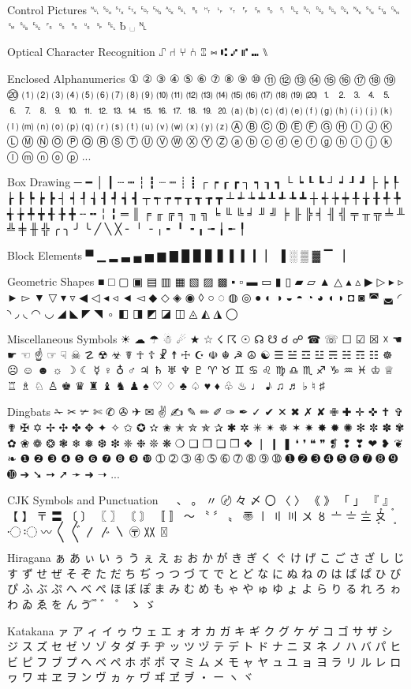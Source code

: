 \documentclass[12pt,twoside]{memoir}
\begin{document}
Control Pictures
␀ ␁ ␂ ␃ ␄ ␅ ␆ ␇ ␈ ␉ ␊ ␋ ␌ ␍ ␎ ␏ ␐ ␑ ␒ ␓ ␔ ␕ ␖ ␗ ␘ ␙ ␚ ␛ ␜ ␝ ␞ ␟ ␠ ␡ ␢ ␣ ␤

Optical Character Recognition
⑀ ⑁ ⑂ ⑃ ⑄ ⑅ ⑆ ⑇ ⑈ ⑉ ⑊

Enclosed Alphanumerics
① ② ③ ④ ⑤ ⑥ ⑦ ⑧ ⑨ ⑩ ⑪ ⑫ ⑬ ⑭ ⑮ ⑯ ⑰ ⑱ ⑲ ⑳ ⑴ ⑵ ⑶ ⑷ ⑸ ⑹ ⑺ ⑻ ⑼ ⑽ ⑾ ⑿ ⒀ ⒁ ⒂ ⒃ ⒄ ⒅ ⒆ ⒇ ⒈ ⒉ ⒊ ⒋ ⒌ ⒍ ⒎ ⒏ ⒐ ⒑ ⒒ ⒓ ⒔ ⒕ ⒖ ⒗ ⒘ ⒙ ⒚ ⒛ ⒜ ⒝ ⒞ ⒟ ⒠ ⒡ ⒢ ⒣ ⒤ ⒥ ⒦ ⒧ ⒨ ⒩ ⒪ ⒫ ⒬ ⒭ ⒮ ⒯ ⒰ ⒱ ⒲ ⒳ ⒴ ⒵ Ⓐ Ⓑ Ⓒ Ⓓ Ⓔ Ⓕ Ⓖ Ⓗ Ⓘ Ⓙ Ⓚ Ⓛ Ⓜ Ⓝ Ⓞ Ⓟ Ⓠ Ⓡ Ⓢ Ⓣ Ⓤ Ⓥ Ⓦ Ⓧ Ⓨ Ⓩ ⓐ ⓑ ⓒ ⓓ ⓔ ⓕ ⓖ ⓗ ⓘ ⓙ ⓚ ⓛ ⓜ ⓝ ⓞ ⓟ ...

Box Drawing
─ ━ │ ┃ ┄ ┅ ┆ ┇ ┈ ┉ ┊ ┋ ┌ ┍ ┎ ┏ ┐ ┑ ┒ ┓ └ ┕ ┖ ┗ ┘ ┙ ┚ ┛ ├ ┝ ┞ ┟ ┠ ┡ ┢ ┣ ┤ ┥ ┦ ┧ ┨ ┩ ┪ ┫ ┬ ┭ ┮ ┯ ┰ ┱ ┲ ┳ ┴ ┵ ┶ ┷ ┸ ┹ ┺ ┻ ┼ ┽ ┾ ┿ ╀ ╁ ╂ ╃ ╄ ╅ ╆ ╇ ╈ ╉ ╊ ╋ ╌ ╍ ╎ ╏ ═ ║ ╒ ╓ ╔ ╕ ╖ ╗ ╘ ╙ ╚ ╛ ╜ ╝ ╞ ╟ ╠ ╡ ╢ ╣ ╤ ╥ ╦ ╧ ╨ ╩ ╪ ╫ ╬ ╭ ╮ ╯ ╰ ╱ ╲ ╳ ╴ ╵ ╶ ╷ ╸ ╹ ╺ ╻ ╼ ╽ ╾ ╿

Block Elements
▀ ▁ ▂ ▃ ▄ ▅ ▆ ▇ █ ▉ ▊ ▋ ▌ ▍ ▎ ▏ ▐ ░ ▒ ▓ ▔ ▕

Geometric Shapes
■ □ ▢ ▣ ▤ ▥ ▦ ▧ ▨ ▩ ▪ ▫ ▬ ▭ ▮ ▯ ▰ ▱ ▲ △ ▴ ▵ ▶ ▷ ▸ ▹ ► ▻ ▼ ▽ ▾ ▿ ◀ ◁ ◂ ◃ ◄ ◅ ◆ ◇ ◈ ◉ ◊ ○ ◌ ◍ ◎ ● ◐ ◑ ◒ ◓ ◔ ◕ ◖ ◗ ◘ ◙ ◚ ◛ ◜ ◝ ◞ ◟ ◠ ◡ ◢ ◣ ◤ ◥ ◦ ◧ ◨ ◩ ◪ ◫ ◬ ◭ ◮ ◯

Miscellaneous Symbols
☀ ☁ ☂ ☃ ☄ ★ ☆ ☇ ☈ ☉ ☊ ☋ ☌ ☍ ☎ ☏ ☐ ☑ ☒ ☓ ☚ ☛ ☜ ☝ ☞ ☟ ☠ ☡ ☢ ☣ ☤ ☥ ☦ ☧ ☨ ☩ ☪ ☫ ☬ ☭ ☮ ☯ ☰ ☱ ☲ ☳ ☴ ☵ ☶ ☷ ☸ ☹ ☺ ☻ ☼ ☽ ☾ ☿ ♀ ♁ ♂ ♃ ♄ ♅ ♆ ♇ ♈ ♉ ♊ ♋ ♌ ♍ ♎ ♏ ♐ ♑ ♒ ♓ ♔ ♕ ♖ ♗ ♘ ♙ ♚ ♛ ♜ ♝ ♞ ♟ ♠ ♡ ♢ ♣ ♤ ♥ ♦ ♧ ♨ ♩ ♪ ♫ ♬ ♭ ♮ ♯

Dingbats
✁ ✂ ✃ ✄ ✆ ✇ ✈ ✉ ✌ ✍ ✎ ✏ ✐ ✑ ✒ ✓ ✔ ✕ ✖ ✗ ✘ ✙ ✚ ✛ ✜ ✝ ✞ ✟ ✠ ✡ ✢ ✣ ✤ ✥ ✦ ✧ ✩ ✪ ✫ ✬ ✭ ✮ ✯ ✰ ✱ ✲ ✳ ✴ ✵ ✶ ✷ ✸ ✹ ✺ ✻ ✼ ✽ ✾ ✿ ❀ ❁ ❂ ❃ ❄ ❅ ❆ ❇ ❈ ❉ ❊ ❋ ❍ ❏ ❐ ❑ ❒ ❖ ❘ ❙ ❚ ❛ ❜ ❝ ❞ ❡ ❢ ❣ ❤ ❥ ❦ ❧ ❶ ❷ ❸ ❹ ❺ ❻ ❼ ❽ ❾ ❿ ➀ ➁ ➂ ➃ ➄ ➅ ➆ ➇ ➈ ➉ ➊ ➋ ➌ ➍ ➎ ➏ ➐ ➑ ➒ ➓ ➔ ➘ ➙ ➚ ➛ ➜ ➝ ...

CJK Symbols and Punctuation
　 、 。 〃 〄 々 〆 〇 〈 〉 《 》 「 」 『 』 【 】 〒 〓 〔 〕 〖 〗 〘 〙 〚 〛 〜 〝 〞 〟 〠 〡 〢 〣 〤 〥 〦 〧 〨 〩 〪 〫 〬 〭 〮 〯 〰 〱 〲 〳 〴 〵 〶 〷 〿

Hiragana
ぁ あ ぃ い ぅ う ぇ え ぉ お か が き ぎ く ぐ け げ こ ご さ ざ し じ す ず せ ぜ そ ぞ た だ ち ぢ っ つ づ て で と ど な に ぬ ね の は ば ぱ ひ び ぴ ふ ぶ ぷ へ べ ぺ ほ ぼ ぽ ま み む め も ゃ や ゅ ゆ ょ よ ら り る れ ろ ゎ わ ゐ ゑ を ん ゔ ゙ ゚ ゛ ゜ ゝ ゞ

Katakana
ァ ア ィ イ ゥ ウ ェ エ ォ オ カ ガ キ ギ ク グ ケ ゲ コ ゴ サ ザ シ ジ ス ズ セ ゼ ソ ゾ タ ダ チ ヂ ッ ツ ヅ テ デ ト ド ナ ニ ヌ ネ ノ ハ バ パ ヒ ビ ピ フ ブ プ ヘ ベ ペ ホ ボ ポ マ ミ ム メ モ ャ ヤ ュ ユ ョ ヨ ラ リ ル レ ロ ヮ ワ ヰ ヱ ヲ ン ヴ ヵ ヶ ヷ ヸ ヹ ヺ ・ ー ヽ ヾ
\end{document}
